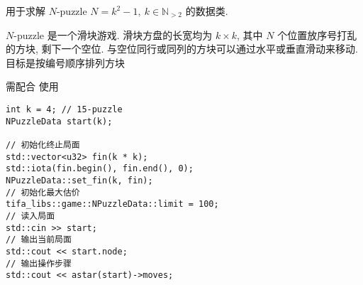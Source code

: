 用于求解 \(N\)-puzzle \(N=k^2-1,~k\in\mathbb{N}_{>2}\) 的数据类.

\(N\)-puzzle 是一个滑块游戏. 滑块方盘的长宽均为 \(k\times k\), 其中 \(N\) 个位置放序号打乱的方块, 剩下一个空位. 与空位同行或同列的方块可以通过水平或垂直滑动来移动. 目标是按编号顺序排列方块

需配合  使用

\begin{verbatim}
int k = 4; // 15-puzzle
NPuzzleData start(k);

// 初始化终止局面
std::vector<u32> fin(k * k);
std::iota(fin.begin(), fin.end(), 0);
NPuzzleData::set_fin(k, fin);
// 初始化最大估价
tifa_libs::game::NPuzzleData::limit = 100;
// 读入局面
std::cin >> start;
// 输出当前局面
std::cout << start.node;
// 输出操作步骤
std::cout << astar(start)->moves;
\end{verbatim}
